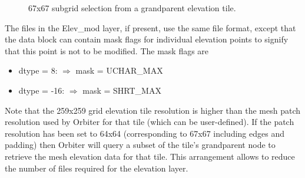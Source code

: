 \documentclass[Orbiter Developer Manual.tex]{subfiles}
\begin{document}
\begin{figure}[H]
	\centering
	\caption{67x67 subgrid selection from a grandparent elevation tile.}
\end{figure}

\noindent
The files in the Elev\_mod layer, if present, use the same file format, except that the data block can contain mask flags for individual elevation points to signify that this point is not to be modified. The mask flags are

\begin{itemize}
\item dtype = 8: $\Rightarrow$ mask = UCHAR\_MAX
\item dtype = -16: $\Rightarrow$ mask = SHRT\_MAX
\end{itemize}

\noindent
Note that the 259x259 grid elevation tile resolution is higher than the mesh patch resolution used by Orbiter for that tile (which can be user-defined). If the patch resolution has been set to 64x64 (corresponding to 67x67 including edges and padding) then Orbiter will query a subset of the tile's grandparent node to retrieve the mesh elevation data for that tile. This arrangement allows to reduce the number of files required for the elevation layer.
\end{document}
